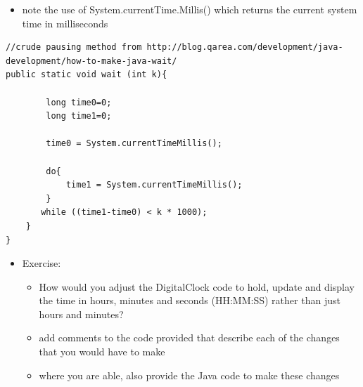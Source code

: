 \documentclass{beamer}
\begin{document}
\begin{frame}[fragile]
\begin{itemize}
\item note the use of System.currentTime.Millis() which returns the current system time in milliseconds
\end{itemize}
\scriptsize
\begin{block}{}
\begin{lstlisting}
//crude pausing method from http://blog.qarea.com/development/java-development/how-to-make-java-wait/
public static void wait (int k){
	
        long time0=0; 
        long time1=0;

        time0 = System.currentTimeMillis();

        do{
            time1 = System.currentTimeMillis();
        }
       while ((time1-time0) < k * 1000);
    }
}
\end{lstlisting}
\end{block}

\end{frame}

\begin{frame}
\begin{itemize}
\item Exercise:
\begin{itemize}
\item How would you adjust the DigitalClock code to hold, update and display the time in hours, minutes and seconds (HH:MM:SS) rather than just hours and minutes?
\item add comments to the code provided that describe each of the changes that you would have to make
\item where you are able, also provide the Java code to make these changes
\end{itemize}
\end{itemize}
\end{frame}
\end{document}
